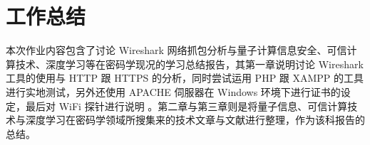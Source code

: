 \chapter{工作总结}
\label{chap:4}

本次作业内容包含了讨论 Wireshark 网络抓包分析与量子计算信息安全、可信计算技术、深度学习等在密码学现况的学习总结报告，其第一章说明讨论 Wireshark 工具的使用与 HTTP 跟 HTTPS 的分析，同时尝试运用 PHP 跟 XAMPP 的工具进行实地测试，另外还使用 APACHE 伺服器在 Windows 环境下进行证书的设定，最后对 WiFi 探针进行说明 。第二章与第三章则是将量子信息、可信计算技术与深度学习在密码学领域所搜集来的技术文章与文献进行整理，作为该科报告的总结。